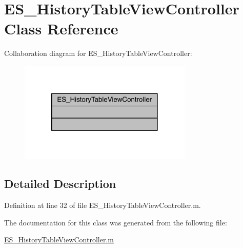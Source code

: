\hypertarget{class_e_s___history_table_view_controller}{\section{E\+S\+\_\+\+History\+Table\+View\+Controller Class Reference}
\label{class_e_s___history_table_view_controller}
}


Collaboration diagram for E\+S\+\_\+\+History\+Table\+View\+Controller\+:\nopagebreak
\begin{figure}[H]
\begin{center}
\leavevmode
\includegraphics[width=234pt]{dd/dbf/class_e_s___history_table_view_controller__coll__graph}
\end{center}
\end{figure}


\subsection{Detailed Description}


Definition at line 32 of file E\+S\+\_\+\+History\+Table\+View\+Controller.\+m.



The documentation for this class was generated from the following file\+:\begin{DoxyCompactItemize}
\item 
\hyperlink{_e_s___history_table_view_controller_8m}{E\+S\+\_\+\+History\+Table\+View\+Controller.\+m}\end{DoxyCompactItemize}
